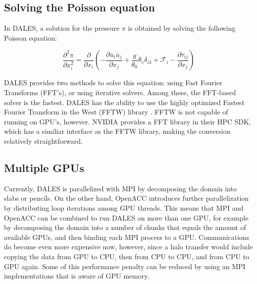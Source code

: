 \subsection{Solving the Poisson equation}

In DALES, a solution for the pressure $\pi$ is obtained by solving the following Poisson equation:

\begin{equation}
    \frac{\partial^2 \pi}{\partial x_i^2} = \frac{\partial }{\partial x_i} \left( - \frac{\partial \overline{u}_i \overline{u}_j}{\partial x_j} + \frac{g}{\theta_0}\overline{\theta}_v\delta_{i3} + \mathcal{F}_i - \frac{\partial \tau_{ij}}{\partial x_j} \right) \label{eq:pressure}
\end{equation}

 DALES provides two methods to solve this equation: using Fast Fourier Transforms (FFT's), or using iterative solvers. Among these, the FFT-based solver is the fastest. DALES has the ability to use the highly optimized Fastest Fourier Transform in the West (FFTW) library \citep{FFTW97}. FFTW is not capable of running on GPU's, however. NVIDIA provides a FFT library in their HPC SDK, which has a similiar interface as the FFTW library, making the conversion relatively straightforward.

\subsection{Multiple GPUs}
Currently, DALES is parallelized with MPI by decomposing the domain into slabs or pencils. On the other hand, OpenACC introduces further parallelization by distributing loop iterations among GPU threads. This means that MPI and OpenACC can be combined to run DALES on more than one GPU, for example by decomposing the domain into a number of chunks that equals the amount of available GPUs, and then binding each MPI process to a GPU. Communications do become even more expensive now, however, since a halo transfer would include copying the data from GPU to CPU, then from CPU to CPU, and from CPU to GPU again. Some of this performance penalty can be reduced by using an MPI implementations that is aware of GPU memory. 

